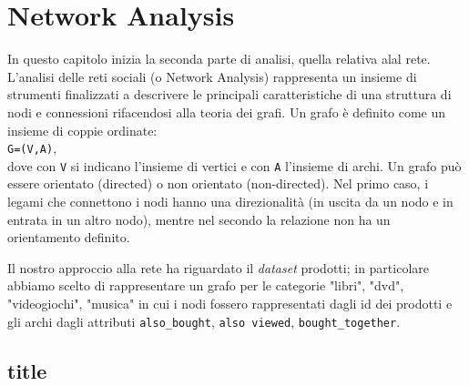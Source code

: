 \chapter{Network Analysis}
	In questo capitolo inizia la seconda parte di analisi, quella relativa alal rete. L’analisi delle reti sociali (o Network Analysis) rappresenta un insieme di strumenti finalizzati
	a descrivere le principali caratteristiche di una struttura di nodi e connessioni rifacendosi alla teoria dei grafi. Un grafo è definito come un insieme di coppie ordinate: \\
	\verb|G=(V,A)|, \\
	dove con \verb|V| si indicano l'insieme di vertici e con \verb|A| l'insieme di archi.	Un grafo può essere orientato (directed) o non orientato (non-directed). Nel primo caso, i	legami che connettono i nodi hanno una direzionalità (in uscita da un nodo e in entrata in un altro nodo), mentre nel secondo la relazione non ha un orientamento definito. 
	
	Il nostro approccio alla rete ha riguardato il \textit{dataset} prodotti; in particolare abbiamo scelto di rappresentare un grafo per le categorie "libri", "dvd", "videogiochi", "musica" in cui i nodi fossero rappresentati dagli id dei prodotti e gli archi dagli attributi \verb|also_bought|, \verb|also viewed|, \verb|bought_together|.
	
	\section{title}
		